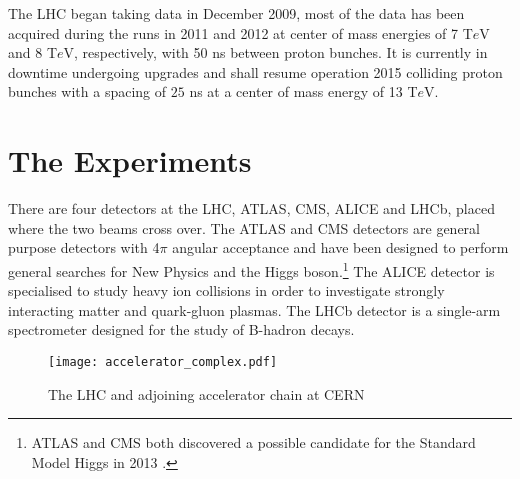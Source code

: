 The LHC began taking data in December 2009, most of the data has been acquired during the runs in 2011 and 2012 at center of mass energies of 7 T$e$V and 8 T$e$V, respectively, with 50 ns between proton bunches. It is currently in downtime undergoing upgrades and shall resume
operation 2015 colliding proton bunches with a spacing of $25$ ns at a center of mass energy of 13 T$e$V. 


\section{The Experiments}
There are four detectors at the LHC, ATLAS, CMS, ALICE and LHCb, placed where the two beams cross over. The ATLAS \cite{ATLAS} and CMS \cite{CMS} detectors are general purpose detectors with 4$\pi$ angular acceptance 
and have been designed to perform general searches for New Physics and the Higgs boson.\footnote{ATLAS and CMS both discovered a possible candidate for the Standard Model Higgs in 2013 \cite{Higgs_ATLAS, Higgs_CMS}.}
The ALICE \cite{ALICE} detector is specialised to study heavy ion collisions in order to investigate strongly interacting matter and quark-gluon plasmas. The LHCb \cite{LHCb} detector is a single-arm spectrometer designed 
for the study of B-hadron decays.





\begin{figure}[h!]
\centering
  \texttt{[image: accelerator\_complex.pdf]}
  \caption{The LHC and adjoining accelerator chain at CERN \cite{LHC}}
  \label{LHC}
\end{figure}



